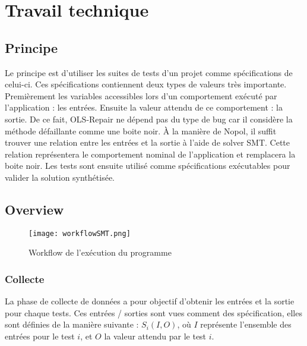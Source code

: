 

\chapter{Travail technique}
	\thispagestyle{document}
	
\section{Principe}
\label{sec:principe}
\par Le principe est d'utiliser les suites de tests d'un projet comme spécifications de celui-ci. Ces spécifications contiennent deux types de valeurs très importante. Premièrement les variables accessibles lors d'un comportement exécuté par l'application : les entrées. Ensuite la valeur attendu de ce comportement : la sortie. De ce fait, OLS-Repair ne dépend pas du type de bug car il considère la méthode défaillante comme une boite noir. À la manière de Nopol\cite{nopol}, il suffit trouver une relation entre les entrées et la sortie à l'aide de solver SMT. Cette relation représentera le comportement nominal de l'application et remplacera la boite noir. Les tests sont ensuite utilisé comme spécifications exécutables pour valider la solution synthétisée.


\section{Overview}
\label{sec:overview}
\begin{figure}[H]
\texttt{[image: workflowSMT.png]}
\caption{Workflow de l'exécution du programme}
\label{fig:workflow}
\end{figure}

\subsection{Collecte}
\label{subsec:collecte}
\par La phase de collecte de données a pour objectif d'obtenir les entrées et la sortie pour chaque tests. Ces entrées / sorties sont vues comment des spécification, elles sont définies de la manière suivante : $S_{i}(I,O)$, où $I$ représente l'ensemble des entrées pour le test $i$, et $O$ la valeur attendu par le test $i$. 

